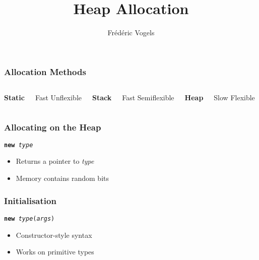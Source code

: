 \usepackage{ucll-code}


\usetikzlibrary{shadows,shapes.multipart}

\title{Heap Allocation}
\author{Fr\'ed\'eric Vogels}






\begin{frame}
  \titlepage
\end{frame}

\begin{frame}
  \frametitle{Allocation Methods}
  \begin{columns}[t]
    \column{3cm}
    \begin{center}
      \textbf{Static}
    \end{center}
    \begin{procontralist}
      \pro Fast
      \con Unflexible
    \end{procontralist}
    \column{3cm}
    \begin{center}
      \textbf{Stack}
    \end{center}
    \begin{procontralist}
      \pro Fast
      \con Semiflexible
    \end{procontralist}
    \column{3cm}
    \begin{center}
      \textbf{Heap}
    \end{center}
    \begin{procontralist}
      \con Slow
      \pro Flexible
    \end{procontralist}
  \end{columns}
\end{frame}

\begin{frame}
  \frametitle{Allocating on the Heap}
  \begin{center}
    \tt {\bfseries new} {\it type}
  \end{center}
  \begin{itemize}
    \item Returns a pointer to {\it type}
    \item Memory contains random bits
  \end{itemize}
  \vskip5mm
\end{frame}

\begin{frame}
  \frametitle{Initialisation}
  \begin{center}
    \tt {\bfseries new} {\it type}({\it args})
  \end{center}
  \begin{itemize}
    \item Constructor-style syntax
    \item Works on primitive types
  \end{itemize}
  \vskip5mm
\end{frame}

